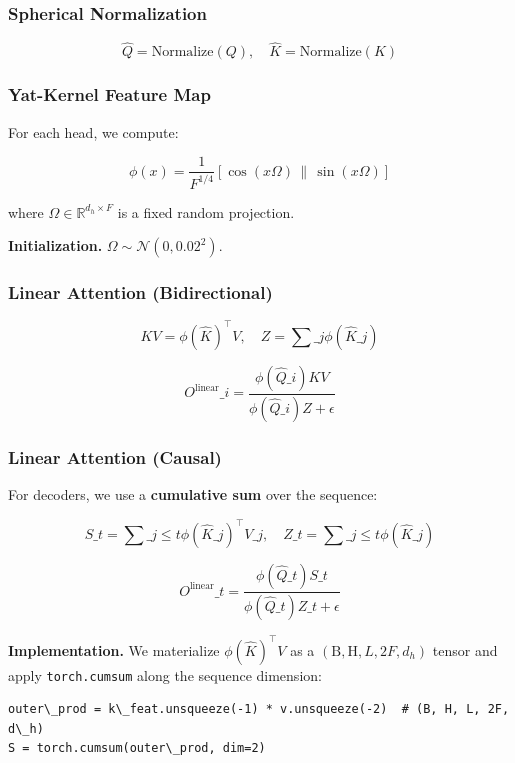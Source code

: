 \subsubsection{Spherical Normalization}

\[
\hat{Q} = \text{Normalize}(Q), \quad
\hat{K} = \text{Normalize}(K)
\]

\subsubsection{Yat-Kernel Feature Map}

For each head, we compute:

\[
\phi(x) = \frac{1}{F^{1/4}} \left[ \cos(x \Omega) \,\|\, \sin(x \Omega) \right]
\]

where $\Omega \in \mathbb{R}^{d_h \times F}$ is a fixed random projection.

\textbf{Initialization.} $\Omega \sim \mathcal{N}(0, 0.02^2)$.

\subsubsection{Linear Attention (Bidirectional)}

\[
KV = \phi(\hat{K})^\top V, \quad
Z = \sum\_j \phi(\hat{K}\_j)
\]

\[
O^\text{linear}\_i = \frac{\phi(\hat{Q}\_i) KV}{\phi(\hat{Q}\_i) Z + \epsilon}
\]

\subsubsection{Linear Attention (Causal)}

For decoders, we use a \textbf{cumulative sum} over the sequence:

\[
S\_t = \sum\_{j \leq t} \phi(\hat{K}\_j)^\top V\_j, \quad
Z\_t = \sum\_{j \leq t} \phi(\hat{K}\_j)
\]

\[
O^\text{linear}\_t = \frac{\phi(\hat{Q}\_t) S\_t}{\phi(\hat{Q}\_t) Z\_t + \epsilon}
\]

\textbf{Implementation.} We materialize $\phi(\hat{K})^\top V$ as a 
$(\text{B}, \text{H}, L, 2F, d_h)$ tensor and apply \texttt{torch.cumsum} along 
the sequence dimension:

\begin{lstlisting}
outer\_prod = k\_feat.unsqueeze(-1) * v.unsqueeze(-2)  # (B, H, L, 2F, d\_h)
S = torch.cumsum(outer\_prod, dim=2)
\end{lstlisting}

